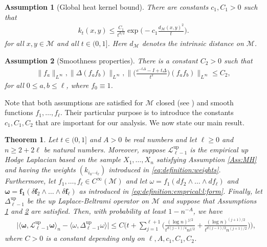 \documentclass[10pt]{article}
\DeclareMathOperator{\up}{up}
\theoremstyle{plain}
\newtheorem{thm}{Theorem}
\newtheorem{assumption}{Assumption}
\theoremstyle{definition}
\theoremstyle{remark}
\begin{document}
\begin{assumption}[Global heat kernel bound]\label{Ass:GHB} There are constants $c_1,C_1>0$ such that 
    \begin{align*}
        k_t(x,y)\leq \frac{C_1}{t^{d/2}}\exp\Big(-c_1\frac{d_{\mathcal{M}}(x,y)^2}{t}\Big). 
    \end{align*}
for all $x,y\in\mathcal{M}$ and all $t\in(0,1]$. Here $d_{\mathcal{M}}$ denotes the intrinsic distance on $\mathcal{M}$.
\end{assumption}


\begin{assumption}[Smoothness properties]\label{Ass:SP} There is a constant $C_2>0$ such that
    \begin{align*}
        \|f_a\|_{L^\infty},\|\Delta (f_af_b)\|_{L^\infty},\Big\|\Big(\frac{e^{-t\Delta}-I+t\Delta}{t^2}\Big)(f_af_b)\Big\|_{L^\infty}\leq C_2,
    \end{align*}
    for all $0\leq a,b\leq \ell$, where $f_0\equiv 1$.
\end{assumption}

Note that both assumptions are satisfied for $\mathcal{M}$ closed (see \cite{MR1736868}) and smooth functions $f_1,\dots,f_\ell$. Their particular purpose is to introduce the constants $c_1, C_1, C_2$ that are important for our analysis. We now state our main result.

    \begin{thm}\label{thm:main:result}
    Let $t\in(0,1]$ and $A>0$ be real numbers and let $\ell\geq 0$ and $n\geq 2+2\ell$ be natural numbers. Moreover, suppose $\mathscr{L}_{\ell-1}^{\up}$ is the empirical up Hodge Laplacian based on the sample $X_1,\dots,X_n$ satisfying Assumption \ref{Ass:MH} and having the weights $(k_{i_0\cdots i_\ell})$ introduced in \eqref{eq:definition:weights}. Furthermore, let $f_1,\dots,f_\ell\in C^\infty(\mathcal{M})$ and let $\omega=f_1(df_2\wedge\dots\wedge df_\ell)$ and $\boldsymbol{\omega}=\mathbf{f_1}(\delta\mathbf{f}_2\wedge\dots\wedge \delta\mathbf{f_\ell})$ as introduced in \eqref{eq:definition:emprical:l:form}. Finally, let $\Delta^{\up}_{\ell-1}$ be the up Laplace-Beltrami operator on $\mathcal{M}$ and suppose that Assumptions \ref{Ass:GHB} and \ref{Ass:SP} are satisfied. Then, with probability at least $1-n^{-A}$, we have
    \begin{align*}
        &\Big|\langle\boldsymbol{\omega},\mathscr{L}_{\ell-1}^{\up}\boldsymbol{\omega}\rangle_n-\langle\omega,\Delta_{\ell-1}^{\up}\omega\rangle\Big|\leq C\Big(t+\sum_{j=1}^{\ell+1}\Big(\frac{(\log n)^{j/2}}{t^{d(j-1)/4}n^{j/2}}+\frac{(\log n)^{(j+1)/2}}{t^{d(j-1)/2}n^{(j+1)/2}}\Big)\Big),
    \end{align*}
    where $C>0$ is a constant depending only on $\ell,A,c_1,C_1,C_2$.
    \end{thm}
\end{document}

